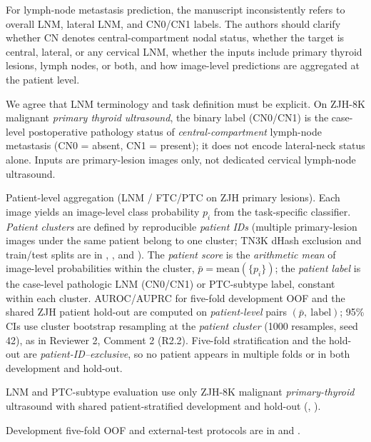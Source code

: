 \begin{reviewercomment}
For lymph-node metastasis prediction, the manuscript inconsistently refers to overall LNM, lateral LNM, and CN0/CN1 labels. The authors should clarify whether CN denotes central-compartment nodal status, whether the target is central, lateral, or any cervical LNM, whether the inputs include primary thyroid lesions, lymph nodes, or both, and how image-level predictions are aggregated at the patient level.
\end{reviewercomment}
\begin{authorresponse}
We agree that LNM terminology and task definition must be explicit. On ZJH-8K malignant \emph{primary thyroid ultrasound}, the binary label (CN0/CN1) is the case-level postoperative pathology status of \emph{central-compartment} lymph-node metastasis (CN0 = absent, CN1 = present); it does not encode lateral-neck status alone. Inputs are primary-lesion images only, not dedicated cervical lymph-node ultrasound.\par
Patient-level aggregation (LNM / FTC/PTC on ZJH primary lesions). Each image yields an image-level class probability $p_i$ from the task-specific classifier. \emph{Patient clusters} are defined by reproducible \emph{patient IDs} (multiple primary-lesion images under the same patient belong to one cluster; TN3K dHash exclusion and train/test splits are in , , and ). The \emph{patient score} is the \emph{arithmetic mean} of image-level probabilities within the cluster, $\bar p=\mathrm{mean}(\{p_i\})$; the \emph{patient label} is the case-level pathologic LNM (CN0/CN1) or PTC-subtype label, constant within each cluster. AUROC/AUPRC for five-fold development OOF and the shared ZJH patient hold-out are computed on \emph{patient-level} pairs $(\bar p,\ \mathrm{label})$; 95\% CIs use cluster bootstrap resampling at the \emph{patient cluster} (1000 resamples, seed 42), as in Reviewer 2, Comment 2 (R2.2). Five-fold stratification and the hold-out are \emph{patient-ID--exclusive}, so no patient appears in multiple folds or in both development and hold-out.\par
LNM and PTC-subtype evaluation use only ZJH-8K malignant \emph{primary-thyroid} ultrasound with shared patient-stratified development and hold-out (, ).\par
Development five-fold OOF and external-test protocols are in  and .\par
\par
\end{authorresponse}

